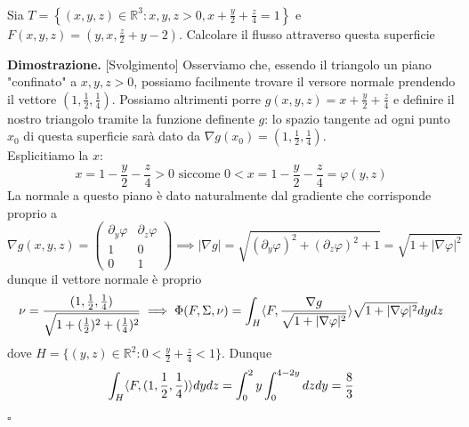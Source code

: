 %
\vspace{0.5cm}
\begin{example}[\textcolor{blue}{esempio di calcolo del flusso attraverso una superficie}] \hspace{1cm} \\
	Sia $T=\left\{(x, y, z) \in \mathbb{R}^3: x, y, z > 0, x + \frac{y}{2}+\frac{z}{4}=1 \right\}$ e $F(x, y, z)=(y, x, \frac{z}{2}+ y - 2)$. Calcolare il flusso attraverso questa superficie
\end{example}

\noindent \textbf{Dimostrazione. } [Svolgimento]
	Osserviamo che, essendo il triangolo un piano "confinato" a $x, y, z > 0$, possiamo facilmente trovare il versore normale prendendo il vettore $(1, \frac{1}{2}, \frac{1}{4})$. Possiamo altrimenti porre
	$g(x, y, z) = x + \frac{y}{2} + \frac{z}{4}$ e definire il nostro triangolo tramite la funzione definente $g$: lo spazio tangente ad ogni punto $x_0$ di questa superficie sarà dato da $\nabla g(x_0) = (1, \frac{1}{2},\frac{1}{4})$. \\
	Esplicitiamo la $x$:
	$$
	x = 1 - \frac{y}{2} - \frac{z}{4} > 0 \text{ siccome } 0 < x = 1 - \frac{y}{2} - \frac{z}{4} = \varphi(y, z)
	$$
	La normale a questo piano è dato naturalmente dal gradiente che corrisponde proprio a
	$$
	\nabla g(x, y, z) = \begin{pmatrix} 
		\partial_y \varphi & \partial_z \varphi \\
		1 & 0 \\
		0 & 1
	\end{pmatrix} \implies |\nabla g| = \sqrt{(\partial_y \varphi)^2 + (\partial_z \varphi)^2 + 1} = \sqrt{1 + |\nabla \varphi|^2} 
	$$
	dunque il vettore normale è proprio
	$$
	\nu = \frac{(1, \frac{1}{2}, \frac{1}{4})}{\sqrt{1 + (\frac{1}{2})^2 + (\frac{1}{4})^2}} \implies \Phi(F, \Sigma, \nu) = \int_H \langle F, \frac{\nabla g}{\sqrt{1 + |\nabla \varphi|^2}} \rangle \sqrt{1 + |\nabla \varphi|^2} dydz
	$$
	dove $H = \{(y, z) \in \mathbb{R}^2 : 0 < \frac{y}{2} + \frac{z}{4} < 1 \}$. Dunque
	$$
	\int_H \langle F, (1, \frac{1}{2}, \frac{1}{4}) \rangle dydz =	\int_0^2 y \int_0^{4 - 2y} dzdy = \frac{8}{3}
	$$
\hfill $\square$
%
\vspace{0.5cm}
